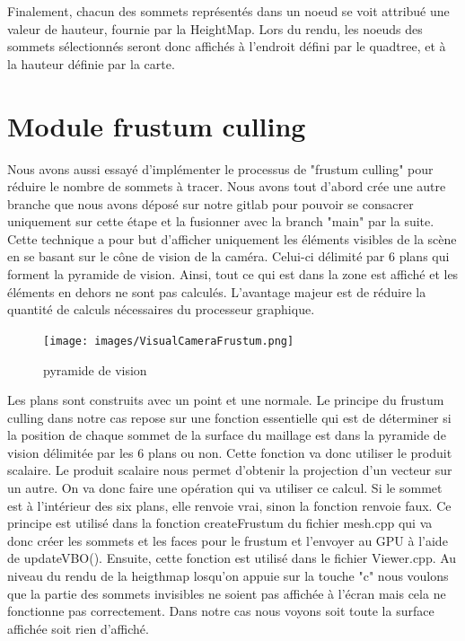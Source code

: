 \documentclass[12pt]{report}
\begin{document}
Finalement, chacun des sommets représentés dans un noeud se voit attribué une valeur de hauteur, fournie par la HeightMap. Lors du rendu, les noeuds des sommets sélectionnés seront donc affichés à l'endroit défini par le quadtree, et à la hauteur définie par la carte.

\section{Module frustum culling}

Nous avons aussi essayé d'implémenter le processus de "frustum culling" pour réduire le nombre de sommets à tracer. Nous avons tout d'abord crée une autre branche que nous avons déposé sur notre gitlab pour pouvoir se consacrer uniquement sur cette étape et la fusionner avec la branch "main" par la suite.
Cette technique a pour but d'afficher uniquement les éléments visibles de la scène en se basant sur le cône de vision de la caméra. Celui-ci délimité par 6 plans qui forment la pyramide de vision.  Ainsi, tout ce qui est dans la zone est affiché et les éléments en dehors ne sont pas calculés. L'avantage majeur est de réduire la quantité de calculs nécessaires du processeur graphique.

\begin{figure}[h]
            \centering
            \texttt{[image: images/VisualCameraFrustum.png]}
            \caption{pyramide de vision}
        \end{figure}
\newpage   
Les plans sont construits avec un point et une normale. Le principe du frustum culling dans notre cas repose sur une fonction essentielle qui est de déterminer si la position de chaque sommet de la surface du maillage est dans la pyramide de vision délimitée par les 6 plans ou non. Cette fonction va donc utiliser le produit scalaire. Le produit scalaire nous permet d'obtenir la projection d'un vecteur sur un autre. 
On va donc faire une opération qui va utiliser ce calcul. Si le sommet est à l'intérieur des six plans, elle renvoie vrai, sinon la fonction renvoie faux.
Ce principe est utilisé dans la fonction createFrustum du fichier mesh.cpp qui va donc créer les sommets et les faces pour le frustum et l'envoyer au GPU à l'aide de updateVBO(). Ensuite, cette fonction est utilisé dans le fichier Viewer.cpp. Au niveau du rendu de la heigthmap losqu'on appuie sur la touche "c" nous voulons que la partie des sommets invisibles ne soient pas affichée à l'écran mais cela ne fonctionne pas correctement. Dans notre cas nous voyons soit toute la surface affichée soit rien d'affiché. 
\end{document}
